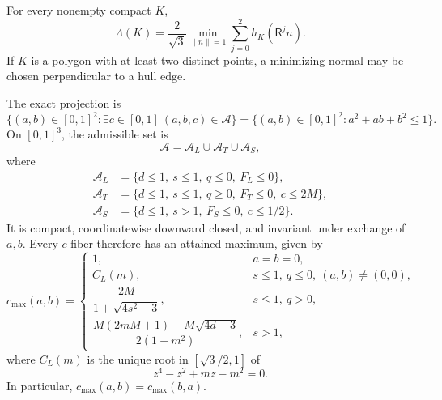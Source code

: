 \begin{lemma}
\label{lem:app-shared-enclosure-gauge}
\label{prop:universal-enclosure-gauge}
\label{prop:new-enclosure-gauge}
For every nonempty compact $K$,
\begin{equation}
 \Lambda(K)=\frac2{\sqrt3}
 \min_{\lVert n\rVert=1}
 \sum_{j=0}^2h_K(\mathsf R^jn).
 \label{eq:app-enclosure-gauge}
\end{equation}
If $K$ is a polygon with at least two distinct points, a minimizing normal
may be chosen perpendicular to a hull edge.
\end{lemma}

\begin{lemma}
\label{lem:app-local-admissible-set}
\label{prop:exact-admissible-set}
\label{prop:new-exact-local-set}
The exact projection is
\begin{equation}
 \{(a,b)\in[0,1]^2:\exists c\in[0,1]\ (a,b,c)\in\mathcal A\}
 =\{(a,b)\in[0,1]^2:a^2+ab+b^2\le1\}.
 \label{eq:app-admissible-projection}
\end{equation}
On $[0,1]^3$, the admissible set is
\begin{equation}
 \mathcal A=\mathcal A_L\cup\mathcal A_T\cup\mathcal A_S,
 \label{eq:derived-admissible-cells}
\end{equation}
where
\begin{align*}
 \mathcal A_L&=\{d\le1,\ s\le1,\ q\le0,\ F_L\le0\},\\
 \mathcal A_T&=\{d\le1,\ s\le1,\ q\ge0,\ F_T\le0,\ c\le2M\},\\
 \mathcal A_S&=\{d\le1,\ s>1,\ F_S\le0,\ c\le1/2\}.
\end{align*}
It is compact, coordinatewise downward closed, and invariant under exchange
of $a,b$.  Every $c$-fiber therefore has an attained maximum, given by
\begin{equation}
 c_{\max}(a,b)=
 \begin{cases}
  1,&a=b=0,\\
  C_L(m),&s\le1,\ q\le0,\ (a,b)\ne(0,0),\\
  \dfrac{2M}{1+\sqrt{4s^2-3}},&s\le1,\ q>0,\\[3mm]
  \dfrac{M(2mM+1)-M\sqrt{4d-3}}{2(1-m^2)},&s>1,
 \end{cases}
 \label{eq:radial-envelope}
\end{equation}
where $C_L(m)$ is the unique root in $[\sqrt3/2,1]$ of
\[
 z^4-z^2+mz-m^2=0.
\]
In particular, $c_{\max}(a,b)=c_{\max}(b,a)$.
\end{lemma}

